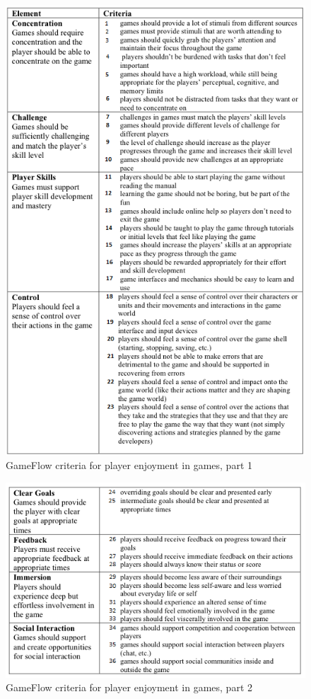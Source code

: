 \begin{figure} [ht!]
\centering
\includegraphics[scale=0.9]{gameflow1}
\caption[GameFlow criteria for player enjoyment in games, part 1]{GameFlow criteria for player enjoyment in games, part 1 \cite{sweetser}}
\label{fig:gameflow1}
\end{figure}  

\begin{figure} [ht!]
\centering
\includegraphics[scale=0.7]{gameflow2}
\caption[GameFlow criteria for player enjoyment in games, part 2]{GameFlow criteria for player enjoyment in games, part 2 \cite{sweetser}}
\label{fig:gameflow2}
\end{figure}  

